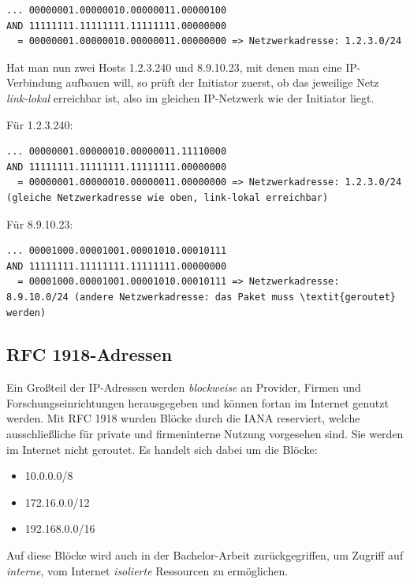 \begin{lstlisting}[label=local-ip-address-AND-subnet,caption=Blub]
... 00000001.00000010.00000011.00000100
AND 11111111.11111111.11111111.00000000
  = 00000001.00000010.00000011.00000000 => Netzwerkadresse: 1.2.3.0/24
\end{lstlisting}
    
Hat man nun zwei Hosts 1.2.3.240 und 8.9.10.23, mit denen man eine IP-Verbindung aufbauen will, so prüft der Initiator zuerst, ob das jeweilige Netz \textit{link-lokal} erreichbar ist, also im gleichen IP-Netzwerk wie der Initiator liegt.

Für 1.2.3.240:

\begin{lstlisting}[label=local-ip-address-AND-subnet-same,caption=Blun]
... 00000001.00000010.00000011.11110000
AND 11111111.11111111.11111111.00000000
  = 00000001.00000010.00000011.00000000 => Netzwerkadresse: 1.2.3.0/24 (gleiche Netzwerkadresse wie oben, link-lokal erreichbar)
\end{lstlisting}

Für 8.9.10.23:

\begin{lstlisting}[label=local-ip-address-AND-subnet-different,caption=Blub]
... 00001000.00001001.00001010.00010111
AND 11111111.11111111.11111111.00000000
  = 00001000.00001001.00001010.00010111 => Netzwerkadresse: 8.9.10.0/24 (andere Netzwerkadresse: das Paket muss \textit{geroutet} werden)
\end{lstlisting}

\subsection{RFC 1918-Adressen}
Ein Großteil der IP-Adressen werden \textit{blockweise} an Provider, Firmen und Forschungseinrichtungen herausgegeben und können fortan im Internet genutzt werden. Mit RFC 1918  wurden Blöcke durch die IANA reserviert, welche ausschließliche für private und firmeninterne Nutzung vorgesehen sind. Sie werden im Internet nicht geroutet. Es handelt sich dabei um die Blöcke:
\begin{itemize}
\item 10.0.0.0/8
\item 172.16.0.0/12
\item 192.168.0.0/16
\end{itemize}

Auf diese Blöcke wird auch in der Bachelor-Arbeit zurückgegriffen, um Zugriff auf \textit{interne}, vom Internet \textit{isolierte} Ressourcen zu ermöglichen.

